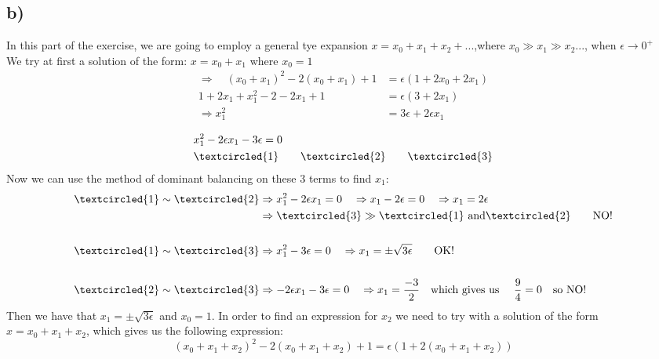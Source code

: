 \documentclass[english,a4paper,12pt]{article}
\begin{document}
\subsection*{b)}
In this part of the exercise, we are going to employ a general tye expansion $x = x_0 + x_1 + x_2 + ...$,where $x_0 \gg x_1 \gg x_2 ...$, when $\epsilon \rightarrow 0^+$\\
We try at first a solution of the form: $x=x_0 + x_1$ where $x_0 = 1$\\
\begin{align*}
\Rightarrow \quad (x_0 + x_1)^2 -2(x_0 + x_1) +1 &= \epsilon(1 + 2x_0 + 2x_1)\\
1 + 2x_1 + x_1^2 -2 -2x_1 + 1 &= \epsilon(3 + 2x_1)\\
\Rightarrow x_1^2 &= 3\epsilon + 2\epsilon x_1
\end{align*}

\begin{align*}
&x_1^2 -2\epsilon x_1 - 3\epsilon = 0\\
&\textcircled{1} \hspace{7mm} \textcircled{2} \hspace{7mm} \textcircled{3}
\end{align*}
Now we can use the method of dominant balancing on these 3 terms to find $x_1$:\\

\begin{align*}
\textcircled{1} \sim \textcircled{2}  &\Rightarrow x_1^2 - 2 \epsilon x_1 = 0 \quad \Rightarrow x_1 - 2\epsilon = 0 \quad \Rightarrow x_1 = 2\epsilon\\
&\Rightarrow \textcircled{3} \gg \textcircled{1} \text{ and} \textcircled{2} \qquad \text{NO!}\\\\
\textcircled{1} \sim \textcircled{3}  &\Rightarrow x_1^2 - 3\epsilon=0 \quad \Rightarrow x_1 = \pm \sqrt{3 \epsilon} \qquad \text{OK!}\\\\
\textcircled{2} \sim \textcircled{3}  &\Rightarrow -2\epsilon x_1 - 3 \epsilon = 0 \quad \Rightarrow x_1 = \frac{-3}{2} \quad \text{which gives us } \quad \frac{9}{4} = 0 \quad \text{so NO!}
\end{align*}
Then we have that $x_1 = \pm \sqrt{3\epsilon}$ and $x_0 = 1$.
In order to find an expression for $x_2$ we need to try with a solution of the form $x=x_0 + x_1 + x_2$, which gives us the following expression:\\
$$(x_0 + x_1 + x_2)^2 -2(x_0 + x_1 + x_2) +1 = \epsilon(1+2(x_0 + x_1 + x_2))$$
\end{document}
